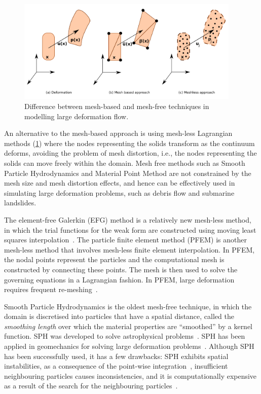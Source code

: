 \begin{figure}[tbhp]
\centering
\includegraphics[width=0.95\textwidth]{NumericalMethods}
\caption{Difference between mesh-based and mesh-free techniques in modelling 
large deformation flow.}
\label{fig:NumericalMethods}
\end{figure}

An alternative to the mesh-based approach is using mesh-less Lagrangian methods 
(\cref{fig:NumericalMethods}) where the nodes representing the solids transform 
as the continuum deforms, avoiding the problem of mesh distortion, i.e., the 
nodes representing the solids can move freely within the domain. Mesh free 
methods such as Smooth Particle Hydrodynamics and Material Point Method are not 
constrained by the mesh size and mesh distortion effects, and hence can be 
effectively used in simulating large deformation problems, such as debris flow 
and submarine landslides.

The element-free Galerkin (EFG) method is a relatively new mesh-less 
method, in which the trial functions for the weak form are constructed using 
moving least squares interpolation~\citep{Belytschko1994}. The particle finite 
element method (PFEM) is another mesh-less method that involves mesh-less 
finite element interpolation. In PFEM, the nodal points represent the 
particles and the computational mesh is constructed by connecting these points. 
The mesh is then used to solve the governing equations in a Lagrangian fashion. 
In PFEM, large deformation requires frequent re-meshing~\citep{Kafaji2013}.

Smooth Particle Hydrodynamics is the oldest mesh-free technique, in which the 
domain is discretised into particles that have a spatial distance, called the 
\textit{smoothing length} over which the material properties are ``smoothed'' 
by a kernel function. SPH was developed to solve astrophysical 
problems~\citep{Monaghan2005}. SPH has been applied in geomechanics for solving 
large deformation problems~\citep{Augarde2009,Maeda2010,Mori2008}. Although SPH 
has been successfully used, it has a few drawbacks: SPH exhibits spatial 
instabilities, as a consequence of the point-wise 
integration~\citep{Bonet2000}, insufficient neighbouring particles causes 
inconsistencies, and it is computationally expensive as a result of the search 
for the neighbouring particles~\citep{Bandara2013}.

